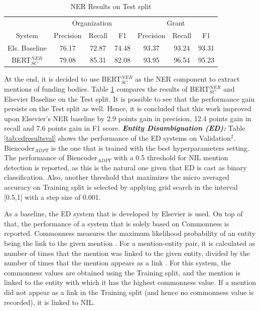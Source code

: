 \documentclass{report}
\theoremstyle{definition}
\theoremstyle{remark}
\begin{document}
\begin{table}
    \centering
    \begin{tabular}{c| c c c| c c c}
    &\multicolumn{3}{c|}{Organization}&\multicolumn{3}{c}{Grant} \\
    System&Precision&Recall&F1&Precision&Recall&F1\\
    \hline
    Els. Baseline &  76.17 & 72.87  & 74.48 & 93.37   & 93.24  & 93.31
 \\[0.7ex]
    BERT$^{NER}_{SC}$ &  79.08 & 85.31 & 82.08& 93.95&   96.54&   95.23
  \\[0.7ex]
    \end{tabular}
    \caption{NER Results on Test split}
    \label{tab:all_ner_results_test}
\end{table}

At the end, it is decided to use BERT$^{NER}_{SC}$ as the NER component to extract mentions of funding bodies. Table \ref{tab:all_ner_results_test} compares the results of BERT$^{NER}_{SC}$ and Elsevier Baseline on the Test split. It is possible to see that the performance gain persists on the Test split as well. Hence, it is concluded that this work improved upon Elsevier's NER baseline by 2.9 points gain in precision, 12.4 points gain in recall and 7.6 points gain in F1 score.
\newline
\newline
\noindent \textit{\textbf{Entity Disambiguation (ED):}} Table \ref{tab:edresultsval} shows the performance of the ED systems on Validation$^2$. Biencoder$_{ADPT}$ is the one that is trained with the best hyperparameters setting. The performance of Biencoder$_{ADPT}$ with a 0.5 threshold for NIL mention detection is reported, as this is the natural one given that ED is cast as binary classification. Also, another threshold that maximizes the micro averaged accuracy on Training split is selected by applying grid search in the interval [0.5,1] with a step size of 0.001. 

As a baseline, the ED system that is developed by Elsevier is used. On top of that, the performance of a system that is solely based on Commonness is reported. Commonness measures the maximum likelihood probability of an entity being the link to the given mention \cite{balog}. For a mention-entity pair, it is calculated as number of times that the mention was linked to the given entity, divided by the number of times that the mention appears as a link \cite{balog}. For this system, the commonness values are obtained using the Training split, and the mention is linked to the entity with which it has the highest commonness value. If a mention did not appear as a link in the Training split (and hence no commonness value is recorded), it is linked to NIL.
\end{document}
